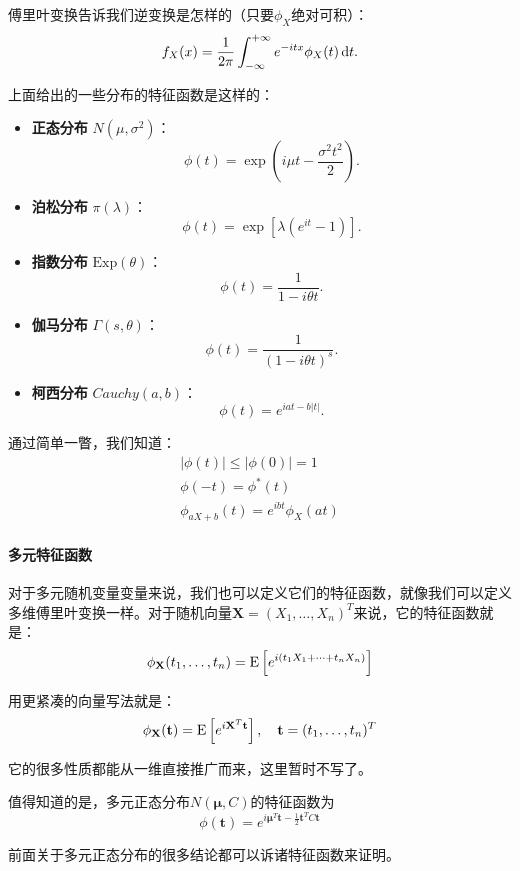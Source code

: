 傅里叶变换告诉我们逆变换是怎样的（只要$\phi_X$绝对可积）：
\[
f_X(x) = \frac{1}{2\pi} \int_{-\infty}^{+\infty} e^{-itx} \phi_X(t) \mathop{}\!\mathrm{d} t.
\]

上面给出的一些分布的特征函数是这样的：
\begin{itemize}
    \item \textbf{正态分布} $N(\mu, \sigma^2)$：
    \[
    \phi(t) = \exp\left(i\mu t - \frac{\sigma^2 t^2}{2}\right).
    \]
    
    \item \textbf{泊松分布} $\pi(\lambda)$：
    \[
    \phi(t) = \exp\left[\lambda(e^{it} - 1)\right].
    \]
    
    \item \textbf{指数分布} $\mathrm{Exp}(\theta)$：
    \[
    \phi(t) = \frac{1}{1 - i\theta t}.
    \]
    
    \item \textbf{伽马分布} $\Gamma(s, \theta)$：
    \[
    \phi(t) = \frac{1}{(1 - i\theta t)^s}.
    \]
    \item \textbf{柯西分布} $Cauchy(a, b)$：
    \[
    \phi(t) = e^{iat-b|t|}.
    \]
\end{itemize}

通过简单一瞥，我们知道：
\begin{gather*}
|\phi(t)|\leq |\phi(0)| = 1\\
\phi(-t) = \phi^*(t)\\
\phi_{aX+b}(t) = e^{ibt}\phi_{X}(at)
\end{gather*}

\paragraph{多元特征函数}
对于多元随机变量变量来说，我们也可以定义它们的特征函数，就像我们可以定义多维傅里叶变换一样。对于随机向量\(\mathbf{X}=(X_1,\ldots,X_n)^T\)来说，它的特征函数就是：
\[
\phi_{\mathbf{X}} (t_1,\ldots,t_n) = \operatorname{E}\left[e^{i (t_1X_1+\cdots+t_n X_n)} \right]
\]

用更紧凑的向量写法就是：
\[
\phi_{\mathbf{X}} (\mathbf{t}) = \operatorname{E}\left[e^{i\mathbf{X}^T\mathbf{t}} \right],\quad \mathbf{t}=(t_1,\ldots,t_n)^T
\]

它的很多性质都能从一维直接推广而来，这里暂时不写了。

值得知道的是，多元正态分布\(N(\boldsymbol{\mu}, C)\)的特征函数为
\[
\phi(\mathbf{t}) = e^{i\boldsymbol{\mu}^T\mathbf{t}-\frac{1}{2}\mathbf{t}^T C\mathbf{t}}
\]

前面关于多元正态分布的很多结论都可以诉诸特征函数来证明。

